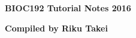 \begin{titlepage}

\begin{center}

\HRule
\vspace{0.4cm}
\Huge{\textbf{BIOC192 Tutorial Notes 2016}}
\HRule

\vfill
\LARGE{\textbf{Compiled by Riku Takei}}

\end{center}

\end{titlepage}
